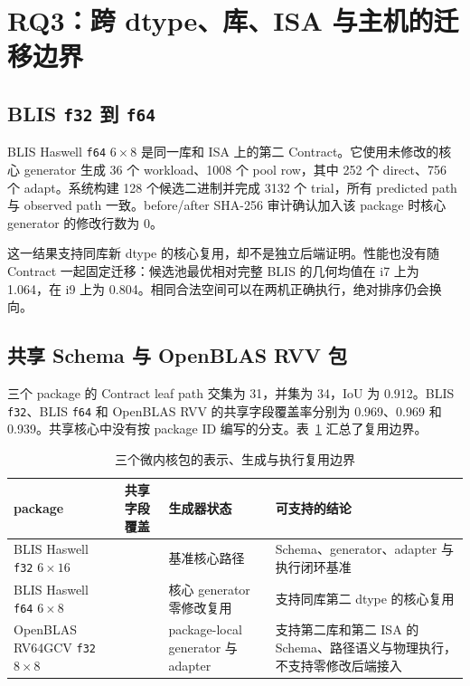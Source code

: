 \section{RQ3：跨 dtype、库、ISA 与主机的迁移边界}

\subsection{BLIS \texttt{f32} 到 \texttt{f64}}

BLIS Haswell \texttt{f64} $6\times8$ 是同一库和 ISA 上的第二 Contract。它使用未修改的核心 generator 生成 36 个 workload、1008 个 pool row，其中 252 个 direct、756 个 adapt。系统构建 128 个候选二进制并完成 3132 个 trial，所有 predicted path 与 observed path 一致。before/after SHA-256 审计确认加入该 package 时核心 generator 的修改行数为 0。

这一结果支持同库新 dtype 的核心复用，却不是独立后端证明。性能也没有随 Contract 一起固定迁移：候选池最优相对完整 BLIS 的几何均值在 i7 上为 1.064，在 i9 上为 0.804。相同合法空间可以在两机正确执行，绝对排序仍会换向。

\subsection{共享 Schema 与 OpenBLAS RVV 包}

三个 package 的 Contract leaf path 交集为 31，并集为 34，IoU 为 0.912。BLIS \texttt{f32}、BLIS \texttt{f64} 和 OpenBLAS RVV 的共享字段覆盖率分别为 0.969、0.969 和 0.939。共享核心中没有按 package ID 编写的分支。表~\ref{tab:chapter5-reuse} 汇总了复用边界。

\begin{table}[!htbp]
  \centering
  \caption{三个微内核包的表示、生成与执行复用边界}
  \label{tab:chapter5-reuse}
  \begin{tabularx}{\textwidth}{
    @{}
    >{\raggedright\arraybackslash}p{}
    >{\centering\arraybackslash}p{}
    >{\raggedright\arraybackslash}p{}
    >{\raggedright\arraybackslash}X
    @{}
  }
    \toprule
    \textbf{package} & \textbf{共享字段覆盖} & \textbf{生成器状态} & \textbf{可支持的结论} \\
    \midrule
    BLIS Haswell \texttt{f32} $6\times16$ & 0.969 & 基准核心路径 & Schema、generator、adapter 与执行闭环基准 \\
    BLIS Haswell \texttt{f64} $6\times8$ & 0.969 & 核心 generator 零修改复用 & 支持同库第二 dtype 的核心复用 \\
    OpenBLAS RV64GCV \texttt{f32} $8\times8$ & 0.939 & package-local generator 与 adapter & 支持第二库和第二 ISA 的 Schema、路径语义与物理执行，不支持零修改后端接入 \\
    \bottomrule
  \end{tabularx}
\end{table}

